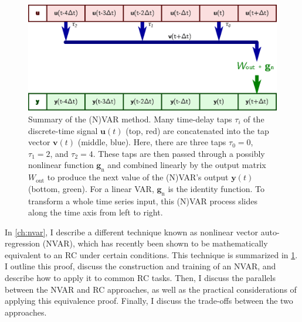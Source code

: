 \begin{figure}
  \includegraphics{figures/var-infer}
  \caption{Summary of the (N)VAR method. Many time-delay taps $\tau_i$
    of the discrete-time signal $\bm{u}(t)$ (top, red) are concatenated into the tap
    vector $\bm{v}(t)$ (middle, blue). Here, there are three taps
    $\tau_0=0$, $\tau_1=2$, and $\tau_2=4$. These taps are then passed
    through a possibly nonlinear function $\bm{g}_\text{n}$ and
    combined linearly by the output matrix $W_\text{out}$ to produce
    the next value of the (N)VAR's output $\bm{y}(t)$ (bottom,
    green). For a linear VAR, $\bm{g}_\text{n}$ is the identity
    function. To transform a whole time series input, this (N)VAR process
    slides along the time axis from left to right.}
  \label{fig:intro-var-infer}
\end{figure}

In \cref{ch:nvar}, I describe a different technique known as nonlinear
vector auto-regression (NVAR), which has recently been shown to be
mathematically equivalent to an RC under certain conditions.  This
technique is summarized in \cref{fig:intro-var-infer}.  I outline this
proof, discuss the construction and training of an NVAR, and describe
how to apply it to common RC tasks. Then, I discuss the parallels
between the NVAR and RC approaches, as well as the practical
considerations of applying this equivalence proof. Finally, I discuss
the trade-offs between the two approaches.

